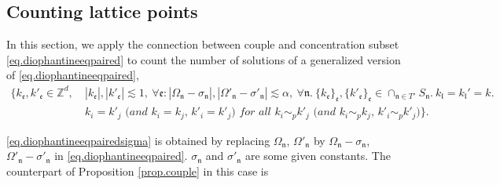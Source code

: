 \subsection{Counting lattice points}\label{sec.numbertheory} In this section, we apply the connection between couple and concentration subset \eqref{eq.diophantineeqpaired} to count the number of solutions of a generalized version of \eqref{eq.diophantineeqpaired},
\begin{equation}\label{eq.diophantineeqpairedsigma}
\begin{split}
    \{k_{\mathfrak{e}}, k'_{\mathfrak{e}}\in \mathbb{Z}^d,\ &|k_{\mathfrak{e}}|, |k'_{\mathfrak{e}}|\lesssim 1,\ \forall \mathfrak{e}: |\Omega_{\mathfrak{n}}-\sigma_{\mathfrak{n}}|,|\Omega'_{\mathfrak{n}}-\sigma'_{\mathfrak{n}}|\lesssim \alpha,\ \forall \mathfrak{n}. \ \{k_{\mathfrak{e}}\}_{\mathfrak{e}}, \{k'_{\mathfrak{e}}\}_{\mathfrak{e}}\in \cap_{\mathfrak{n}\in T'} S_{\mathfrak{n}}.\ k_{\mathfrak{l}}=k_{\mathfrak{l}}'=k. \\
    &\textit{$k_{i}=k'_{j}$ (and $k_{i}=k_{j}$, $k'_{i}=k'_{j}$) for all $k_{i}\sim_{p}k'_{j}$ (and $k_{i}\sim_{p}k_{j}$, $k'_{i}\sim_{p}k'_{j}$)}\}.
\end{split}
\end{equation}

\eqref{eq.diophantineeqpairedsigma} is obtained by replacing $\Omega_{\mathfrak{n}}$, $\Omega'_{\mathfrak{n}}$ by $\Omega_{\mathfrak{n}}-\sigma_{\mathfrak{n}}$, $\Omega'_{\mathfrak{n}}-\sigma'_{\mathfrak{n}}$ in \eqref{eq.diophantineeqpaired}. $\sigma_{\mathfrak{n}}$ and $\sigma'_{\mathfrak{n}}$ are some given constants. The counterpart of Proposition \ref{prop.couple} in this case is

